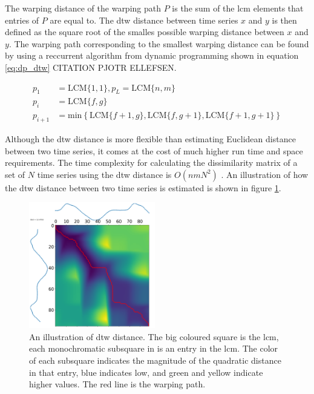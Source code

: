 The warping distance of the warping path $P$ is the sum of the \acrshort{lcm} elements that entries of $P$ are equal to. The \acrshort{dtw} distance between time series $x$ and $y$ is then defined as the square root of the smalles possible warping distance between $x$ and $y$. The warping path corresponding to the smallest warping distance can be found by using a reccurrent algorithm from dynamic programming shown in equation \eqref{eq:dp_dtw} CITATION PJOTR ELLEFSEN.

\begin{equation}
    \begin{split}
        p_1     &= \mathrm{LCM}\{ 1,1 \}, p_L = \mathrm{LCM}\{ n,m \}  \\
        p_{i}   &= \mathrm{LCM}\{ f,g \} \\
        p_{i+1} &= \mathrm{min} \left \{ \mathrm{LCM} \{ f+1,g\}, \mathrm{LCM} \{ f,g+1\}, \mathrm{LCM} \{ f+1,g+1\} \right  \}
    \end{split}
    \label{eq:dp_dtw}
\end{equation}

Although the \acrshort{dtw} distance is more flexible than estimating Euclidean distance between two time series, it comes at the cost of much higher run time and space requirements. The time complexity for calculating the dissimilarity matrix of a set of $N$ time series using the \acrshort{dtw} distance is $O\left ( n m N^{2} \right )$ \cite{tsc_rev}. An illustration of how the \acrshort{dtw} distance between two time series is estimated is shown in figure \ref{fig:warping_path}. 

\begin{figure}
    \centering
    \includegraphics[width=0.49\textwidth]{machine-learning/warping_path_2_curves.png}
    \caption{An illustration of \acrshort{dtw} distance. The big coloured square is the \acrshort{lcm}, each monochromatic subsquare in is an entry in the \acrshort{lcm}. The color of each subsquare indicates the magnitude of the quadratic distance in that entry, blue indicates low, and green and yellow indicate higher values. The red line is the warping path.}
    \label{fig:warping_path}
\end{figure}

